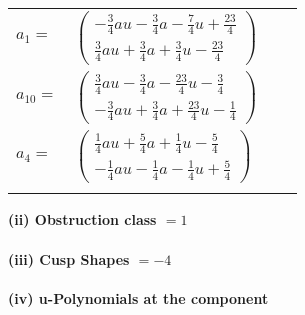 \documentclass[1p]{elsarticle_modified}
\theoremstyle{definition}
\begin{document}
\begin{tabular}{m{7pt} m{180pt} m{7pt} m{180pt} }
\flushright $a_{1}=$&$\begin{pmatrix}-\frac{3}{4} a u-\frac{3}{4} a-\frac{7}{4} u+\frac{23}{4}\\\frac{3}{4} a u+\frac{3}{4} a+\frac{3}{4} u-\frac{23}{4}\end{pmatrix}$ \\
\flushright $a_{10}=$&$\begin{pmatrix}\frac{3}{4} a u-\frac{3}{4} a-\frac{23}{4} u-\frac{3}{4}\\-\frac{3}{4} a u+\frac{3}{4} a+\frac{23}{4} u-\frac{1}{4}\end{pmatrix}$ \\
\flushright $a_{4}=$&$\begin{pmatrix}\frac{1}{4} a u+\frac{5}{4} a+\frac{1}{4} u-\frac{5}{4}\\-\frac{1}{4} a u-\frac{1}{4} a-\frac{1}{4} u+\frac{5}{4}\end{pmatrix}$\\&\end{tabular}
\flushleft \textbf{(ii) Obstruction class $= 1$}\\~\\
\flushleft \textbf{(iii) Cusp Shapes $= -4$}\\~\\
\newpage\renewcommand{\arraystretch}{1}
\flushleft \textbf{(iv) u-Polynomials at the component}\newline \\
\end{document}
